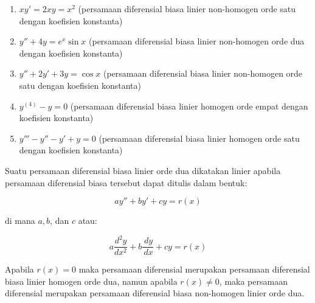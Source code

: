 \begin{enumerate}[1.]

	\item \begin{math} xy' = 2xy = x^{2} \end{math} (persamaan diferensial biasa linier non-homogen orde satu dengan koefisien konstanta)
	\item \begin{math} y'' + 4y = e^{x} \sin x \end{math} (persamaan diferensial biasa linier non-homogen orde dua dengan koefisien konstanta)
	\item \begin{math} y'' + 2y' + 3y = \cos x \end{math} (persamaan diferensial biasa linier non-homogen orde satu dengan koefisien konstanta)
	\item \begin{math} y^{(4)} - y = 0 \end{math} (persamaan diferensial biasa linier homogen orde empat dengan koefisien konstanta)
	\item \begin{math} y''' - y'' - y' + y = 0 \end{math} (persamaan diferensial biasa linier homogen orde satu dengan koefisien konstanta)

\end{enumerate}

Suatu persamaan diferensial biasa linier orde dua dikatakan linier apabila persamaan diferensial biasa tersebut dapat ditulis dalam bentuk:

\begin{equation} ay'' + by' + cy = r(x) \end{equation}

di mana \begin{math} a, b \end{math}, dan \begin{math} c \end{math} atau:

\begin{displaymath} a \dfrac{d^{2}y}{dx^{2}} + b \dfrac{\, dy}{\, dx} + cy = r(x) \end{displaymath}

Apabila \begin{math} r(x) = 0 \end{math} maka persamaan diferensial merupakan persamaan diferensial biasa linier homogen orde dua, namun apabila \begin{math} r(x) \neq 0 \end{math}, maka persamaan diferensial merupakan persamaan diferensial biasa non-homogen linier orde dua.

